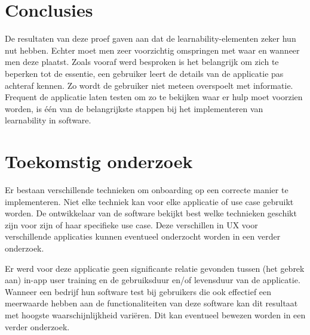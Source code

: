 \documentclass[a0,portrait]{a0poster}
\begin{document}
\begin{multicols}{2}
\color{HoGentAccent1} 
\section*{Conclusies}
\color{black}

De resultaten van deze proef gaven aan dat de learnability-elementen zeker hun nut hebben. Echter moet men zeer voorzichtig omspringen met waar en wanneer men deze plaatst. Zoals vooraf werd besproken is het belangrijk om zich te beperken tot de essentie, een gebruiker leert de details van de applicatie pas achteraf kennen. Zo wordt de gebruiker niet meteen overspoelt met informatie. Frequent de applicatie laten testen om zo te bekijken waar er hulp moet voorzien worden, is één van de belangrijkste stappen bij het implementeren van learnability in software.

\color{HoGentAccent1} 
\section*{Toekomstig onderzoek}
\color{black}

Er bestaan verschillende technieken om onboarding op een correcte manier te implementeren. Niet elke techniek kan voor elke applicatie of use case gebruikt worden. De ontwikkelaar van de software bekijkt best welke technieken geschikt zijn voor zijn of haar specifieke use case. Deze verschillen in UX voor verschillende applicaties kunnen eventueel onderzocht worden in een verder onderzoek.

Er werd voor deze applicatie geen significante relatie gevonden tussen (het gebrek aan) in-app user training en de gebruiksduur en/of levensduur van de applicatie. Wanneer een bedrijf hun software test bij gebruikers die ook effectief een meerwaarde hebben aan de functionaliteiten van deze software kan dit resultaat met hoogste waarschijnlijkheid variëren. Dit kan eventueel bewezen worden in een verder onderzoek.

\end{multicols}
\end{document}
